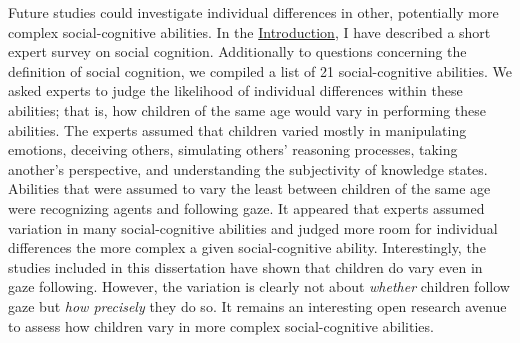 \documentclass[
]{scrbook}
\begin{document}
Future studies could investigate individual differences in other, potentially more complex social-cognitive abilities. In the \hyperref[introduction]{Introduction}, I have described a short expert survey on social cognition. Additionally to questions concerning the definition of social cognition, we compiled a list of 21 social-cognitive abilities. We asked experts to judge the likelihood of individual differences within these abilities; that is, how children of the same age would vary in performing these abilities. The experts assumed that children varied mostly in manipulating emotions, deceiving others, simulating others' reasoning processes, taking another's perspective, and understanding the subjectivity of knowledge states. Abilities that were assumed to vary the least between children of the same age were recognizing agents and following gaze. It appeared that experts assumed variation in many social-cognitive abilities and judged more room for individual differences the more complex a given social-cognitive ability. Interestingly, the studies included in this dissertation have shown that children do vary even in gaze following. However, the variation is clearly not about \emph{whether} children follow gaze but \emph{how precisely} they do so. It remains an interesting open research avenue to assess how children vary in more complex social-cognitive abilities.
\end{document}
